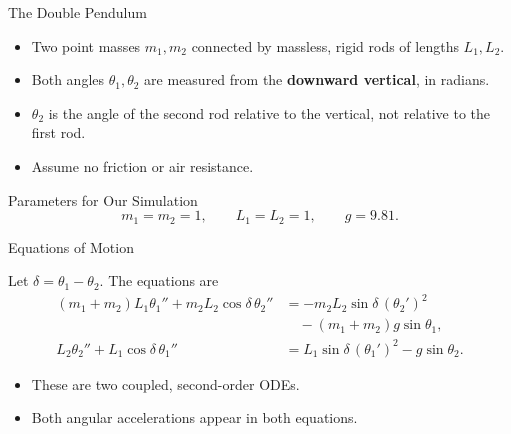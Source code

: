 \documentclass[10pt]{beamer}
\begin{document}
\begin{frame}{The Double Pendulum}

\begin{itemize}
    \item Two point masses $m_1,m_2$ connected by massless,
    rigid rods of lengths $L_1,L_2$.
    \item Both angles $\theta_1,\theta_2$ are measured from the
    \textbf{downward vertical}, in radians.
    \item $\theta_2$ is the angle of the second rod relative to
    the vertical, not relative to the first rod.
    \item Assume no friction or air resistance.
\end{itemize}

\begin{block}{Parameters for Our Simulation}
\[
m_1=m_2=1,\qquad L_1=L_2=1,\qquad g=9.81.
\]
\end{block}


\end{frame}

\begin{frame}{Equations of Motion}

Let $\delta=\theta_1-\theta_2$. The equations are
\[
\begin{aligned}
(m_1+m_2)L_1\theta_1''
+m_2L_2\cos\delta\,\theta_2''
&=
-m_2L_2\sin\delta\,(\theta_2')^2\\
&\quad -(m_1+m_2)g\sin\theta_1,\\[3mm]
L_2\theta_2''
+L_1\cos\delta\,\theta_1''
&=
L_1\sin\delta\,(\theta_1')^2
-g\sin\theta_2.
\end{aligned}
\]

\begin{itemize}
    \item These are two coupled, second-order ODEs.
    \item Both angular accelerations appear in both equations.
\end{itemize}



\end{frame}
\end{document}
